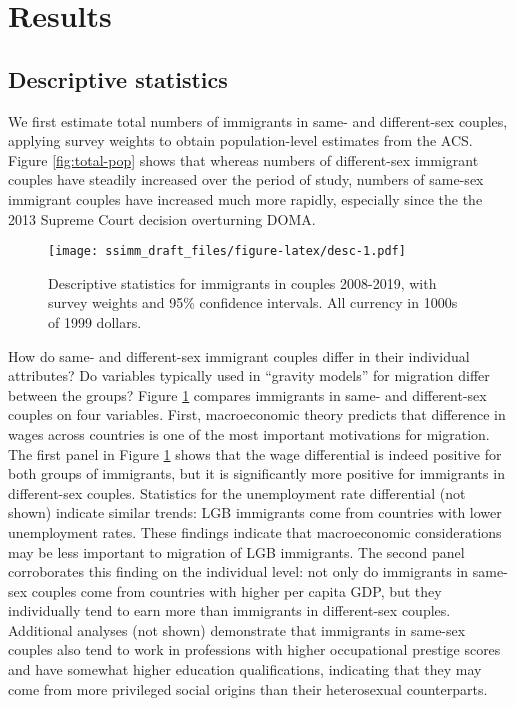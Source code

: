 \documentclass[
  11pt,
]{article}
\begin{document}
\hypertarget{results}{%
\section{Results}\label{results}}

\hypertarget{descriptive-statistics}{%
\subsection{Descriptive statistics}\label{descriptive-statistics}}

We first estimate total numbers of immigrants in same- and different-sex couples, applying survey weights to obtain population-level estimates from the ACS. Figure \ref{fig:total-pop} shows that whereas numbers of different-sex immigrant couples have steadily increased over the period of study, numbers of same-sex immigrant couples have increased much more rapidly, especially since the the 2013 Supreme Court decision overturning DOMA.

\begin{figure}
\centering
\texttt{[image: ssimm\_draft\_files/figure-latex/desc-1.pdf]}
\caption{\label{fig:desc}Descriptive statistics for immigrants in couples 2008-2019, with survey weights and 95\% confidence intervals. All currency in 1000s of 1999 dollars.}
\end{figure}

How do same- and different-sex immigrant couples differ in their individual attributes? Do variables typically used in ``gravity models'' for migration differ between the groups? Figure \ref{fig:desc} compares immigrants in same- and different-sex couples on four variables. First, macroeconomic theory predicts that difference in wages across countries is one of the most important motivations for migration. The first panel in Figure \ref{fig:desc} shows that the wage differential is indeed positive for both groups of immigrants, but it is significantly more positive for immigrants in different-sex couples. Statistics for the unemployment rate differential (not shown) indicate similar trends: LGB immigrants come from countries with lower unemployment rates. These findings indicate that macroeconomic considerations may be less important to migration of LGB immigrants. The second panel corroborates this finding on the individual level: not only do immigrants in same-sex couples come from countries with higher per capita GDP, but they individually tend to earn more than immigrants in different-sex couples. Additional analyses (not shown) demonstrate that immigrants in same-sex couples also tend to work in professions with higher occupational prestige scores and have somewhat higher education qualifications, indicating that they may come from more privileged social origins than their heterosexual counterparts.
\end{document}
